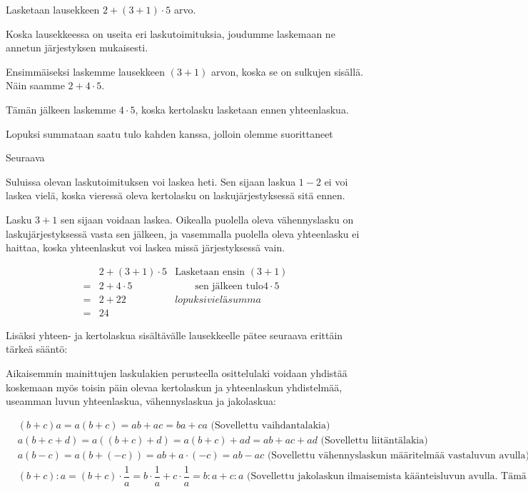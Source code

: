 \begin{esimerkki}
Lasketaan lausekkeen $2+(3+1)\cdot 5$ arvo.

Koska lausekkeessa on useita eri laskutoimituksia, joudumme laskemaan ne annetun järjestyksen mukaisesti.

Ensimmäiseksi laskemme lausekkeen $(3+1)$ arvon, koska se on sulkujen sisällä. Näin saamme $2+4\cdot 5$.

Tämän jälkeen laskemme $4\cdot 5$, koska kertolasku lasketaan ennen yhteenlaskua. 

Lopuksi summataan saatu tulo kahden kanssa, jolloin olemme suorittaneet 

Seuraava

Suluissa olevan laskutoimituksen voi laskea heti. Sen sijaan laskua $1-2$ ei voi laskea vielä,
koska vieressä oleva kertolasku on laskujärjestyksessä sitä ennen. %

Lasku $3+1$ sen sijaan voidaan laskea. Oikealla puolella oleva vähennyslasku on
laskujärjestyksessä vasta sen jälkeen, ja vasemmalla puolella oleva yhteenlasku ei haittaa,
koska yhteenlaskut voi laskea missä järjestyksessä vain.

\begin{align*}
   &2+(3+1)\cdot 5&\textrm{Lasketaan ensin } (3+1)
\\= &2+4\cdot5&\qquad\textrm{sen jälkeen tulo} 4\cdot 5 
\\= &2+22& {lopuksi vielä summa}
\\= &24&
\end{align*}
\end{esimerkki}

Lisäksi yhteen- ja kertolaskua sisältävälle lausekkeelle pätee seuraava erittäin tärkeä sääntö:


Aikaisemmin mainittujen laskulakien perusteella osittelulaki voidaan yhdistää koskemaan myös toisin päin olevaa kertolaskun ja yhteenlaskun yhdistelmää, useamman luvun yhteenlaskua, vähennyslaskua ja jakolaskua:

\begin{align*}
&(b+c)a = a(b+c) = ab+ac = ba+ca \text{ (Sovellettu vaihdantalakia)} \\
&a(b+c+d) = a((b+c)+d) = a(b+c)+ad = ab+ac+ad \text{ (Sovellettu liitäntälakia)} \\
&a(b-c) = a(b+(-c))=ab+a\cdot(-c)=ab-ac \text{ (Sovellettu vähennyslaskun määritelmää vastaluvun avulla)} \\
&(b+c):a = (b+c)\cdot\dfrac1a = b\cdot\dfrac1a+c\cdot\dfrac1a = b:a+c:a \text{ (Sovellettu jakolaskun ilmaisemista käänteisluvun avulla. Tämä ominaisuus esitellään myöhemmin rationaalilukujen yhteydessä.) }
\end{align*}

